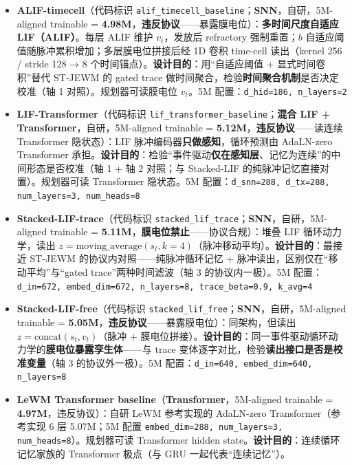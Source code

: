 \documentclass[11pt,a4paper]{article}
\begin{document}
\begin{itemize}[leftmargin=2em]
    \item \textbf{ALIF-timecell}（代码标识 \texttt{alif\_timecell\_baseline}；\textbf{SNN}，自研，5M-aligned trainable = \textbf{4.98M}，\textbf{违反协议}——暴露膜电位）：\textbf{多时间尺度自适应 LIF（ALIF）}。每层 ALIF 维护 $v_t$，发放后 refractory 强制重置；$b$ 自适应阈值随脉冲累积增加；多层膜电位拼接后经 1D 卷积 time-cell 读出（kernel 256 / stride 128 → 8 个时间锚点）。\textbf{设计目的}：用“自适应阈值 + 显式时间卷积”替代 ST-JEWM 的 gated trace 做时间聚合，检验\textbf{时间聚合机制}是否决定校准（轴 1 对照）。规划器可读膜电位 $v_t$。5M 配置：\texttt{d\_hid=186, n\_layers=2}
    \item \textbf{LIF-Transformer}（代码标识 \texttt{lif\_transformer\_baseline}；\textbf{混合 LIF + Transformer}，自研，5M-aligned trainable = \textbf{5.12M}，\textbf{违反协议}——读连续 Transformer 隐状态）：LIF 脉冲编码器\textbf{只做感知}，循环预测由 AdaLN-zero Transformer 承担。\textbf{设计目的}：检验“事件驱动\textbf{仅在感知层}、记忆为连续”的中间形态是否校准（轴 1 + 轴 2 对照；与 Stacked-LIF 的纯脉冲记忆直接对置）。规划器可读 Transformer 隐状态。5M 配置：\texttt{d\_snn=288, d\_tx=288, num\_layers=3, num\_heads=8}
    \item \textbf{Stacked-LIF-trace}（代码标识 \texttt{stacked\_lif\_trace}；\textbf{SNN}，自研，5M-aligned trainable = \textbf{5.11M}，\textbf{膜电位禁止}——协议合规）：堆叠 LIF 循环动力学，读出 $z = \text{moving\_average}(s_t, k{=}4)$（脉冲移动平均）。\textbf{设计目的}：最接近 ST-JEWM 的协议内对照——纯脉冲循环记忆 + 脉冲读出，区别仅在“移动平均”与“gated trace”两种时间滤波（轴 3 的协议内一极）。5M 配置：\texttt{d\_in=672, embed\_dim=672, n\_layers=8, trace\_beta=0.9, k\_avg=4}
    \item \textbf{Stacked-LIF-free}（代码标识 \texttt{stacked\_lif\_free}；\textbf{SNN}，自研，5M-aligned trainable = \textbf{5.05M}，\textbf{违反协议}——暴露膜电位）：同架构，但读出 $z = \text{concat}(s_t, v_t)$（脉冲 + 膜电位拼接）。\textbf{设计目的}：同一事件驱动循环动力学的\textbf{膜电位暴露孪生体}——与 trace 变体逐字对比，检验\textbf{读出接口是否是校准变量}（轴 3 的协议外一极）。5M 配置：\texttt{d\_in=640, embed\_dim=640, n\_layers=8}
    \item \textbf{LeWM Transformer baseline}（\textbf{Transformer}，5M-aligned trainable = \textbf{4.97M}，违反协议）：自研 LeWM 参考实现的 AdaLN-zero Transformer（参考实现 6 层 5.07M；5M 配置 \texttt{embed\_dim=288, num\_layers=3, num\_heads=8}）。规划器可读 Transformer hidden state。\textbf{设计目的}：连续循环记忆家族的 Transformer 极点（与 GRU 一起代表“连续记忆”）。

\end{itemize}
\end{document}
